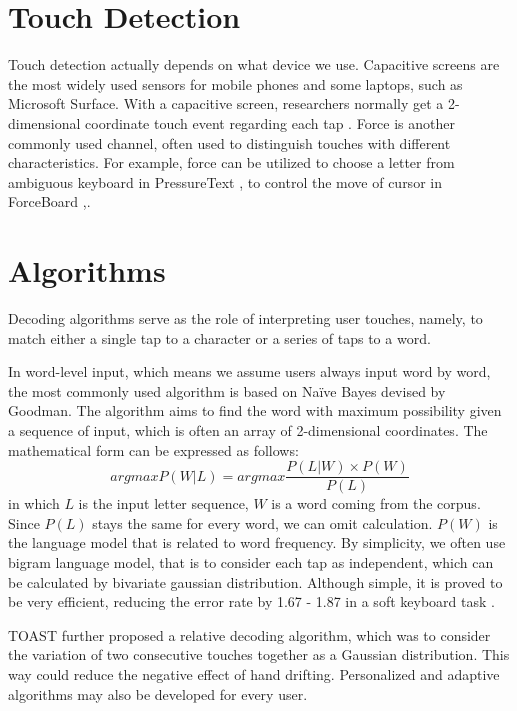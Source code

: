 \begin{survey}
\section{Touch Detection}
Touch detection actually depends on what device we use. Capacitive screens are the most widely used sensors for mobile phones and some laptops, such as Microsoft Surface. With a capacitive screen, researchers normally get a 2-dimensional coordinate touch event regarding each tap \cite{shi2018toast, lu2017blindtype}. Force is another commonly used channel, often used to distinguish touches with different characteristics. For example, force can be utilized to choose a letter from ambiguous keyboard in PressureText \cite{mccallum2009pressuretext}, to control the move of cursor in ForceBoard \cite{zhong2018forceboard},.

\section{Algorithms}
Decoding algorithms serve as the role of interpreting user touches, namely, to match either a single tap to a character or a series of taps to a word.

In word-level input, which means we assume users always input word by word, the most commonly used algorithm is based on Na\"ive Bayes devised by Goodman\cite{goodman2002language}. The algorithm aims to find the word with maximum possibility given a sequence of input, which is often an array of 2-dimensional coordinates. The mathematical form can be expressed as follows:
\begin{equation}
  argmax P(W|L) = argmax \frac{P(L|W) \times P(W)}{P(L)}
\end{equation}
in which $L$ is the input letter sequence, $W$ is a word coming from the corpus. Since $P(L)$ stays the same for every word, we can omit calculation. $P(W)$ is the language model that is related to word frequency. By simplicity, we often use bigram language model, that is to consider each tap as independent, which can be calculated by bivariate gaussian distribution. Although simple, it is proved to be very efficient, reducing the error rate by 1.67 - 1.87 in a soft keyboard task \cite{goodman2002language}. 

TOAST \cite{shi2018toast} further proposed a relative decoding algorithm, which was to consider the variation of two consecutive touches together as a Gaussian distribution. This way could reduce the negative effect of hand drifting. Personalized and adaptive algorithms may also be developed for every user.


\end{survey}
